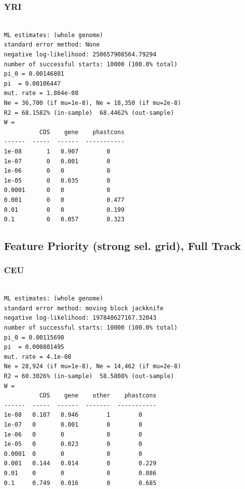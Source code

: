 \documentclass[11pt]{article}
\begin{document}
\subsubsection*{YRI}
\begin{minipage}{\linewidth}\begin{footnotesize}
\begin{verbatim}

ML estimates: (whole genome)
standard error method: None
negative log-likelihood: 250657908564.79294
number of successful starts: 10000 (100.0% total)
pi_0 = 0.00146801
pi  = 0.00106447
mut. rate = 1.864e-08 
Ne = 36,700 (if mu=1e-8), Ne = 18,350 (if mu=2e-8)
R2 = 68.1582% (in-sample)  68.4462% (out-sample)
W = 
          CDS    gene    phastcons
------  -----  ------  -----------
1e-08       1   0.907        0
1e-07       0   0.001        0
1e-06       0   0            0
1e-05       0   0.035        0
0.0001      0   0            0
0.001       0   0            0.477
0.01        0   0            0.199
0.1         0   0.057        0.323
\end{verbatim}
\end{footnotesize}\end{minipage}


\subsection{Feature Priority (strong sel. grid), Full Track}
\subsubsection*{CEU}
\begin{minipage}{\linewidth}\begin{footnotesize}
\begin{verbatim}

ML estimates: (whole genome)
standard error method: moving block jackknife
negative log-likelihood: 197848627167.32043
number of successful starts: 10000 (100.0% total)
pi_0 = 0.00115698
pi  = 0.000801495
mut. rate = 4.1e-08 
Ne = 28,924 (if mu=1e-8), Ne = 14,462 (if mu=2e-8)
R2 = 60.3026% (in-sample)  58.5808% (out-sample)
W = 
          CDS    gene    other    phastcons
------  -----  ------  -------  -----------
1e-08   0.107   0.946        1        0
1e-07   0       0.001        0        0
1e-06   0       0            0        0
1e-05   0       0.023        0        0
0.0001  0       0            0        0
0.001   0.144   0.014        0        0.229
0.01    0       0            0        0.086
0.1     0.749   0.016        0        0.685
\end{verbatim}
\end{footnotesize}\end{minipage}
\end{document}
